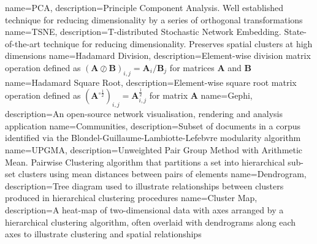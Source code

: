 {
name={PCA},
description={Principle Component Analysis. Well established technique for reducing dimensionality by a series of orthogonal transformations \cite{PCA}} 
}
{
name={TSNE},
description={T-distributed Stochastic Network Embedding. State-of-the-art technique for reducing dimensionality. Preserves spatial clusters at high dimensions \cite{tsne1}} 
}
{
name={Hadamard Division},
description={Element-wise division matrix operation defined as $\left( \mathbf{A} \oslash \mathbf{B} \right)_{i , j} = \mathbf{A}_i / \mathbf{B}_j  $ for matrices $\mathbf{A}$ and $\mathbf{B}$} 
}
{
name={Hadamard Square Root},
description={Element-wise square root matrix operation defined as $\left( \mathbf{A}^{\circ\frac{1}{2}} \right)_{i , j} = \mathbf{A}_{i , j}^{\frac{1}{2}} $ for matrix $\mathbf{A}$} 
}
{
name={Gephi},
description={An open-source network visualisation, rendering and analysis application} 
}
{
name={Communities},
description={Subset of documents in a corpus identified via the Blondel-Guillaume-Lambiotte-Lefebvre modularity algorithm \cite{modularity1}\cite{modularity2}} 
}
{
name={UPGMA},
description={Unweighted Pair Group Method with Arithmetic Mean. Pairwise Clustering algorithm that partitions a set into hierarchical sub-set clusters using mean distances between pairs of elements \cite{heatmapcluster}} 
}
{
name={Dendrogram},
description={Tree diagram used to illustrate relationships between clusters produced in hierarchical clustering procedures \cite{dendrogram}} 
}
{
name={Cluster Map},
description={A heat-map of two-dimensional data with axes arranged by a hierarchical clustering algorithm, often overlaid with dendrograms along each axes to illustrate clustering and spatial relationships \cite{dendrogram} \cite{seaborn} \cite{scipy}} 
}